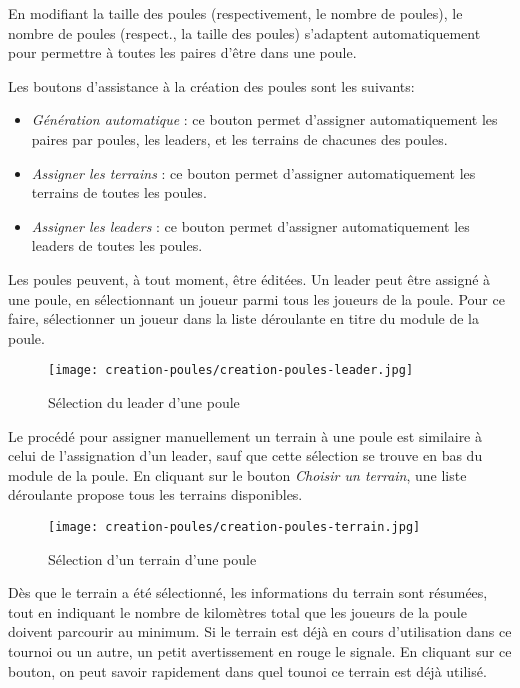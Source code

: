 En modifiant la taille des poules (respectivement, le nombre de poules), le nombre de poules (respect., la taille des poules) s'adaptent automatiquement pour permettre à toutes les paires d'être dans une poule.\newline

Les boutons d'assistance à la création des poules sont les suivants:

\begin{itemize}
\item \textit{Génération automatique} : ce bouton permet d'assigner automatiquement les paires par poules, les leaders, et les terrains de chacunes des poules.
\item \textit{Assigner les terrains} : ce bouton permet d'assigner automatiquement les terrains de toutes les poules.
\item \textit{Assigner les leaders} : ce bouton permet d'assigner automatiquement les leaders de toutes les poules.
\end{itemize}
\bigskip

Les poules peuvent, à tout moment, être éditées. Un leader peut être assigné à une poule, en sélectionnant un joueur parmi tous les joueurs de la poule. Pour ce faire, sélectionner un joueur dans la liste déroulante en titre du module de la poule.

\begin{figure}[H]
\centering
\texttt{[image: creation-poules/creation-poules-leader.jpg]}
\caption{Sélection du leader d'une poule}
\end{figure}

Le procédé pour assigner manuellement un terrain à une poule est similaire à celui de l'assignation d'un leader, sauf que cette sélection se trouve en bas du module de la poule. En cliquant sur le bouton \textit{Choisir un terrain}, une liste déroulante propose tous les terrains disponibles.

\begin{figure}[H]
\centering
\texttt{[image: creation-poules/creation-poules-terrain.jpg]}
\caption{Sélection d'un terrain d'une poule}
\end{figure}

Dès que le terrain a été sélectionné, les informations du terrain sont résumées, tout en indiquant le nombre de kilomètres total que les joueurs de la poule doivent parcourir au minimum. Si le terrain est déjà en cours d'utilisation dans ce tournoi ou un autre, un petit avertissement en rouge le signale. En cliquant sur ce bouton, on peut savoir rapidement dans quel tounoi ce terrain est déjà utilisé.

